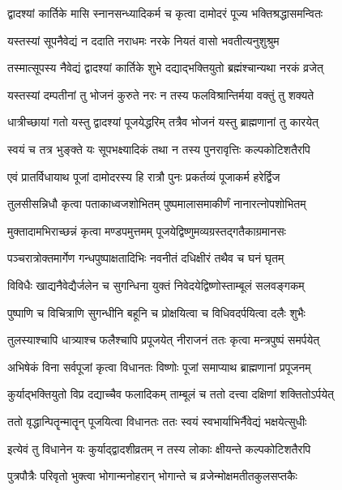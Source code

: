 \twolineshloka
{द्वादश्यां कार्तिके मासि स्नानसन्ध्यादिकर्म च}
{कृत्वा दामोदरं पूज्य भक्तिश्रद्धासमन्वितः} %

\twolineshloka
{यस्तस्यां सूपनैवेद्यं न ददाति नराधमः}
{नरके नियतं वासो भवतीत्यनुशुश्रुम} %

\twolineshloka
{तस्मात्सूपस्य नैवेद्यं द्वादश्यां कार्तिके शुभे}
{दद्याद्भक्तियुतो ब्रह्मंश्चान्यथा नरकं व्रजेत्} %

\twolineshloka
{यस्तस्यां दम्पतीनां तु भोजनं कुरुते नरः}
{न तस्य फलविश्रान्तिर्मया वक्तुं तु शक्यते} %

\twolineshloka
{धात्रीच्छायां गतो यस्तु द्वादश्यां पूजयेद्धरिम्}
{तत्रैव भोजनं यस्तु ब्राह्मणानां तु कारयेत्} %

\twolineshloka
{स्वयं च तत्र भुङ्क्ते यः सूपभक्ष्यादिकं तथा}
{न तस्य पुनरावृत्तिः कल्पकोटिशतैरपि} %

\twolineshloka
{एवं प्रातर्विधायाथ पूजां दामोदरस्य हि}
{रात्रौ पुनः प्रकर्तव्यं पूजाकर्म हरेर्द्विज} %

\twolineshloka
{तुलसीसन्निधौ कृत्वा पताकाध्वजशोभितम्}
{पुष्पमालासमाकीर्णं नानारत्नोपशोभितम्} %

\twolineshloka
{मुक्तादामभिराच्छन्नं कृत्वा मण्डपमुत्तमम्}
{पूजयेद्विष्णुमव्यग्रस्तद्गतैकाग्रमानसः} %

\twolineshloka
{पञ्चरात्रोक्तमार्गेण गन्धपुष्पाक्षतादिभिः}
{नवनीतं दधिक्षीरं तथैव च घनं घृतम्} %

\twolineshloka
{विविधैः खाद्यनैवेद्यैर्जलेन च सुगन्धिना}
{युक्तं निवेदयेद्विष्णोस्ताम्बूलं सलवङ्गकम्} %

\twolineshloka
{पुष्पाणि च विचित्राणि सुगन्धीनि बहूनि च}
{प्रोक्षयित्वा च विधिवदर्पयित्वा दलैः शुभैः} %

\twolineshloka
{तुलस्याश्चापि धात्र्याश्च फलैश्चापि प्रपूजयेत्}
{नीराजनं ततः कृत्वा मन्त्रपुष्पं समर्पयेत्} %

\twolineshloka
{अभिषेकं विना सर्वपूजां कृत्वा विधानतः}
{विष्णोः पूजां समाप्याथ ब्राह्मणानां प्रपूजनम्} %

\twolineshloka
{कुर्याद्भक्तियुतो विप्र दद्याच्चैव फलादिकम्}
{ताम्बूलं च ततो दत्त्वा दक्षिणां शक्तितोऽर्पयेत्} %

\twolineshloka
{ततो वृद्धान्पितॄन्मातॄन् पूजयित्वा विधानतः}
{ततः स्वयं स्वभार्याभिर्नैवेद्यं भक्षयेत्सुधीः} %

\twolineshloka
{इत्येवं तु विधानेन यः कुर्याद्द्वादशीव्रतम्}
{न तस्य लोकाः क्षीयन्ते कल्पकोटिशतैरपि} %

\twolineshloka
{पुत्रपौत्रैः परिवृतो भुक्त्वा भोगान्मनोहरान्}
{भोगान्ते च व्रजेन्मोक्षमतीतकुलसप्तकैः} %

